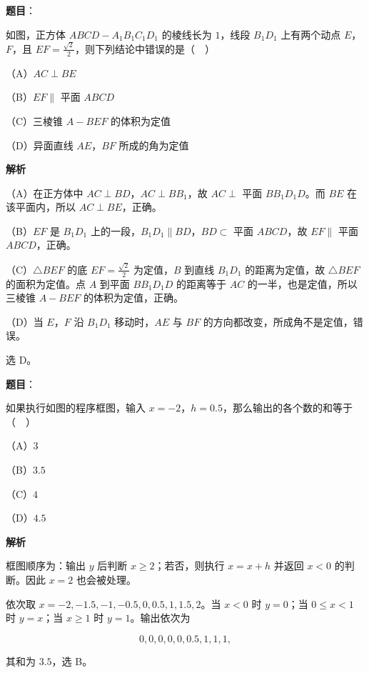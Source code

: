 \begin{answer}

\textbf{题目}：

如图，正方体 $ABCD-A_1B_1C_1D_1$ 的棱线长为 $1$，线段 $B_1D_1$ 上有两个动点 $E$，$F$，且 $EF=\frac{\sqrt2}{2}$，则下列结论中错误的是（　）
\nopagebreak[4]
\begin{center}\end{center}
\nopagebreak[4]
（A）$AC\perp BE$

（B）$EF\parallel$ 平面 $ABCD$

（C）三棱锥 $A-BEF$ 的体积为定值

（D）异面直线 $AE$，$BF$ 所成的角为定值

\textbf{解析}

（A）在正方体中 $AC\perp BD$，$AC\perp BB_1$，故 $AC\perp$ 平面 $BB_1D_1D$。而 $BE$ 在该平面内，所以 $AC\perp BE$，正确。

（B）$EF$ 是 $B_1D_1$ 上的一段，$B_1D_1\parallel BD$，$BD\subset$ 平面 $ABCD$，故 $EF\parallel$ 平面 $ABCD$，正确。

（C）$\triangle BEF$ 的底 $EF=\frac{\sqrt2}{2}$ 为定值，$B$ 到直线 $B_1D_1$ 的距离为定值，故 $\triangle BEF$ 的面积为定值。点 $A$ 到平面 $BB_1D_1D$ 的距离等于 $AC$ 的一半，也是定值，所以三棱锥 $A-BEF$ 的体积为定值，正确。

（D）当 $E$，$F$ 沿 $B_1D_1$ 移动时，$AE$ 与 $BF$ 的方向都改变，所成角不是定值，错误。

选 D。


\end{answer}
\begin{answer}

\textbf{题目}：

如果执行如图的程序框图，输入 $x=-2$，$h=0.5$，那么输出的各个数的和等于（　）
\nopagebreak[4]
\begin{center}\end{center}
\nopagebreak[4]
（A）$3$

（B）$3.5$

（C）$4$

（D）$4.5$

\textbf{解析}

框图顺序为：输出 $y$ 后判断 $x\geqslant2$；若否，则执行 $x=x+h$ 并返回 $x<0$ 的判断。因此 $x=2$ 也会被处理。

依次取 $x=-2,-1.5,-1,-0.5,0,0.5,1,1.5,2$。当 $x<0$ 时 $y=0$；当 $0\leqslant x<1$ 时 $y=x$；当 $x\geqslant1$ 时 $y=1$。输出依次为

\nopagebreak[4]
\[0,0,0,0,0,0.5,1,1,1,\]

其和为 $3.5$，选 B。


\end{answer}
